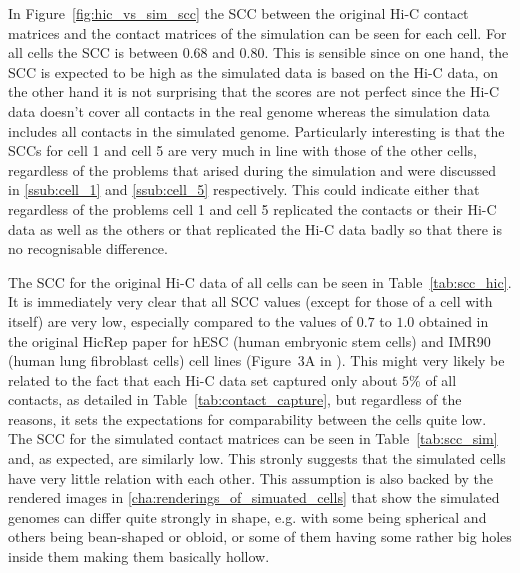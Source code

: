In Figure~\ref{fig:hic_vs_sim_scc} the SCC between the original Hi-C contact matrices and the contact matrices of the simulation can be seen for each cell. For all cells the SCC is between 0.68 and 0.80. This is sensible since on one hand, the SCC is expected to be high as the simulated data is based on the Hi-C data, on the other hand it is not surprising that the scores are not perfect since the Hi-C data doesn’t cover all contacts in the real genome whereas the simulation data includes all contacts in the simulated genome. Particularly interesting is that the SCCs for cell 1 and cell 5 are very much in line with those of the other cells, regardless of the problems that arised during the simulation and were discussed in \ref{ssub:cell_1} and \ref{ssub:cell_5} respectively. This could indicate either that regardless of the problems cell 1 and cell 5 replicated the contacts or their Hi-C data as well as the others or that replicated the Hi-C data badly so that there is no recognisable difference.

The SCC for the original Hi-C data of all cells can be seen in Table~\ref{tab:scc_hic}. It is immediately very clear that all SCC values (except for those of a cell with itself) are very low, especially compared to the values of \(0.7\) to \(1.0\) obtained in the original HicRep paper for hESC (human embryonic stem cells) and IMR90 (human lung fibroblast cells) cell lines (Figure~3A in \cite{yang_hicrep_2017}). This might very likely be related to the fact that each Hi-C data set captured only about \(5\%\) of all contacts, as detailed in Table~\ref{tab:contact_capture}, but regardless of the reasons, it sets the expectations for comparability between the cells quite low. The SCC for the simulated contact matrices can be seen in Table~\ref{tab:scc_sim} and, as expected, are similarly low. This stronly suggests that the simulated cells have very little relation with each other. This assumption is also backed by the rendered images in \ref{cha:renderings_of_simuated_cells} that show the simulated genomes can differ quite strongly in shape, e.g. with some being spherical and others being bean-shaped or obloid, or some of them having some rather big holes inside them making them basically hollow.

